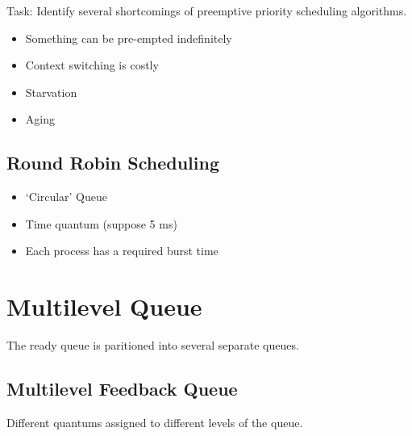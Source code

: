 \documentclass{article}
\begin{document}
Task: Identify several shortcomings of preemptive priority scheduling
algorithms.

\begin{itemize}
    \item Something can be pre-empted indefinitely
    \item Context switching is costly
    \item Starvation
    \item Aging
\end{itemize}

\subsection*{Round Robin Scheduling}

\begin{itemize}
    \item `Circular' Queue
    \item Time quantum (suppose 5 ms)
    \item Each process has a required burst time
\end{itemize}

\section*{Multilevel Queue}
The ready queue is paritioned into several separate queues.

\subsection*{Multilevel Feedback Queue}

Different quantums assigned to different levels of the queue.
\end{document}
